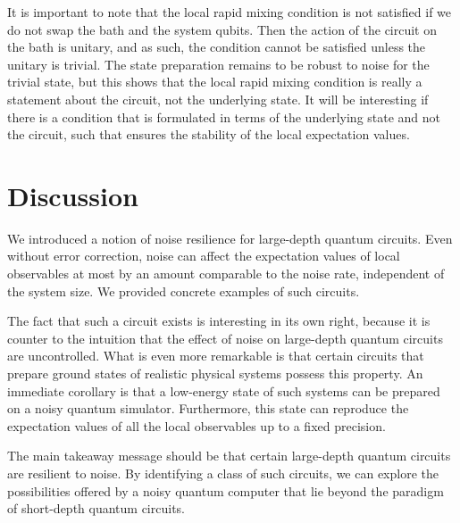 \documentclass[prx,aps,amsmath,amssymb,floatfix,superscriptaddress,11pt,tightenlines,longbibliography,onecolumn,notitlepage]{revtex4-1}
\begin{document}
It is important to note that the local rapid mixing condition is not satisfied if we do not swap the bath and the system qubits. Then the action of the circuit on the bath is unitary, and as such, the condition cannot be satisfied unless the unitary is trivial. The state preparation remains to be robust to noise for the trivial state, but this shows that the local rapid mixing condition is really a statement about the circuit, not the underlying state. It will be interesting if there is a condition that is formulated in terms of the underlying state and not the circuit, such that ensures the stability of the local expectation values.

\section{Discussion\label{section:Discussion}}
We introduced a notion of noise resilience for large-depth quantum circuits. Even without error correction, noise can affect the expectation values of local observables at most by an amount comparable to the noise rate, independent of the system size. We provided concrete examples of such circuits.

The fact that such a circuit exists is interesting in its own right, because it is counter to the intuition that the effect of noise on large-depth quantum circuits are uncontrolled. What is even more remarkable is that certain circuits that prepare ground states of realistic physical systems possess this property. An immediate corollary is that a low-energy state of such systems can be prepared on a noisy quantum simulator. Furthermore, this state can reproduce the expectation values of all the local observables up to a fixed precision.

The main takeaway message should be that certain large-depth quantum circuits are resilient to noise. By identifying a class of such circuits, we can explore the possibilities offered  by a noisy quantum computer that lie beyond the paradigm of short-depth quantum circuits.
\end{document}
